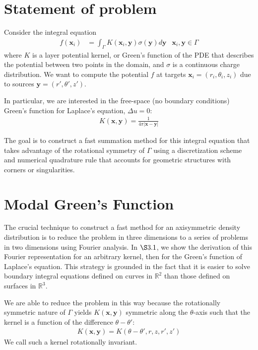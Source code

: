 \documentclass[11pt, oneside]{article}   	%
\begin{document}
\section{Statement of problem}
Consider the integral equation
\begin{align}
f(\mathbf{x}_i) &= \int_\Gamma K(\mathbf{x}_i,\mathbf{y})\sigma(\mathbf{y})d\mathbf{y} &\mathbf{x}_i,\mathbf{y}\in\Gamma
\end{align}
where $K$ is a layer potential kernel, or Green's function of the PDE that describes the potential between two points in the domain, and $\sigma$ is a continuous charge distribution. We want to compute the potential $f$  at targets $\mathbf{x}_i = (r_i,\theta_i,z_i)$ due to sources $\mathbf{y}=(r',\theta',z')$.

In particular, we are interested in the free-space (no boundary conditions) Green's function for Laplace's equation, $\Delta u = 0$:
\begin{align}
K(\mathbf{x},\mathbf{y}) = \frac{1}{4\pi |\mathbf{x}-\mathbf{y}|}
\end{align}

The goal is to construct a fast summation method for this integral equation that takes advantage of the rotational symmetry of $\Gamma$ using a discretization scheme and numerical quadrature rule that accounts for geometric structures with corners or singularities.

\section{Modal Green's Function}

The crucial technique to construct a fast method for an axisymmetric density distribution is to reduce the problem in three dimensions to a series of problems in two dimensions using Fourier analysis. In $\S3.1$, we show the derivation of this Fourier representation for an arbitrary kernel, then for the Green's function of Laplace's equation. This strategy is grounded in the fact that it is easier to solve boundary integral equations defined on curves in $\mathbb{R}^2$ than those defined on surfaces in $\mathbb{R}^3$.

We are able to reduce the problem in this way because the rotationally symmetric nature of $\Gamma$ yields $K(\mathbf{x},\mathbf{y})$ symmetric along the $\theta$-axis such that the kernel is a function of the difference $\theta-\theta'$:
\begin{align*}
K(\mathbf{x},\mathbf{y})=K(\theta-\theta',r,z,r',z')
\end{align*}
We call such a kernel rotationally invariant.
\end{document}
